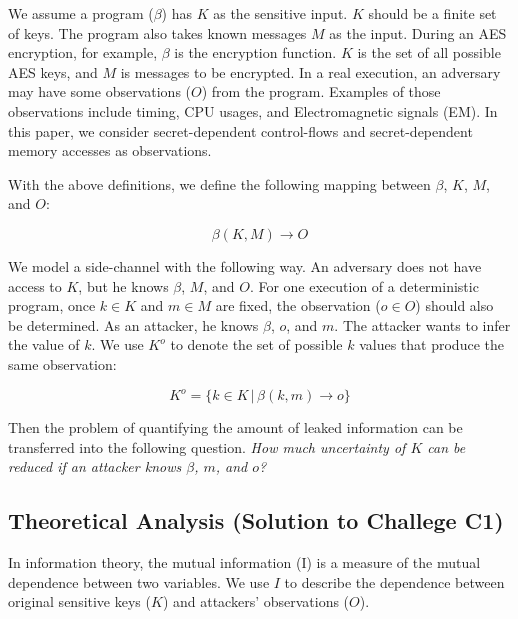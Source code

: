 We assume a program ($\beta$) has $K$ as the sensitive input. $K$ should be a
finite set of keys. The program also takes known messages $M$ as the input. 
During an AES encryption, for example, 
$\beta$ is the encryption function. $K$ is the set of all possible AES keys, 
and $M$ is messages to be
encrypted. In a real execution, an adversary may have some observations ($O$)
from the program. Examples of those observations include timing, CPU usages, and
Electromagnetic signals (EM). In this paper, we consider secret-dependent
control-flows and secret-dependent memory accesses as observations.

With the above definitions, we define the following mapping between $\beta$,
$K$, $M$, and $O$:

\begin{displaymath}
    \beta(K, M) \rightarrow O
\end{displaymath}

We model a side-channel with the following way. An adversary does not have
access to $K$, but he knows $\beta$, $M$, and $O$. For one execution of a
deterministic program, once $k \in K$ and $m \in M$ are fixed, the observation
($o \in O$) should also be determined. As an attacker, he knows $\beta$, $o$,
and $m$. The attacker wants to infer the value of $k$. We use $K^o$ to denote
the set of possible $k$ values that produce the same observation:

\begin{displaymath}
    K^o = \{ k \in K \, |\, \beta(k, m) \rightarrow o\}
\end{displaymath}

Then the problem of quantifying the amount of leaked information can be
transferred into the following question.
\emph{How much uncertainty of $K$ can be reduced if an attacker knows $\beta$, $m$, and $o$?}

\subsection{Theoretical Analysis \textbf{(Solution to Challege C1)}}
In information theory, the mutual information (I) is a measure of the mutual
dependence between two variables. We use $I$ to describe the
dependence between original sensitive keys ($K$) and attackers' observations ($O$).


